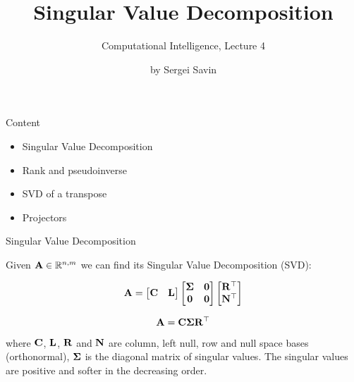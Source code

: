 \documentclass{beamer}
\title{Singular Value Decomposition}
\subtitle{Computational Intelligence, Lecture 4}
\author{by Sergei Savin}
\date{\mydate}
\begin{document}
\maketitle


\begin{frame}{Content}

\begin{itemize}
\item Singular Value Decomposition
\item Rank and pseudoinverse
\item SVD of a transpose
\item Projectors
\end{itemize}

\end{frame}



\begin{frame}{Singular Value Decomposition}
\begin{flushleft}

Given $\mathbf{A} \in \mathbb{R}^{n, m}$ we can find its Singular Value Decomposition (SVD):

\begin{equation}
  \mathbf{A} = 
  \begin{bmatrix}
  	\mathbf{C} & \mathbf{L}
  \end{bmatrix}
\begin{bmatrix}
\mathbf{\Sigma} & \mathbf{0} \\
\mathbf{0} & \mathbf{0}
\end{bmatrix}
\begin{bmatrix}
\mathbf{R}^\top \\ \mathbf{N}^\top
\end{bmatrix}
\end{equation}

\begin{equation}
\mathbf{A} = 
\mathbf{C} \mathbf{\Sigma} \mathbf{R}^\top
\end{equation}

where $\mathbf{C}$, $\mathbf{L}$, $\mathbf{R}$ and $\mathbf{N}$ are column, left null, row and null space bases (orthonormal), $\mathbf{\Sigma}$ is the diagonal matrix of singular values. The singular values are positive and softer in the decreasing order.


\end{flushleft}
\end{frame}
\end{document}

